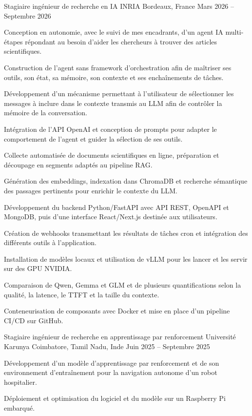 
\begin{cventries}
  \cventry
    {Stagiaire ingénieur de recherche en IA}
    {INRIA}
    {Bordeaux, France}
    {Mars 2026 -- Septembre 2026}
    {
      \begin{cvitems}
        \item {Conception en autonomie, avec le suivi de mes encadrants, d’un agent IA multi-étapes répondant au besoin d’aider les chercheurs à trouver des articles scientifiques.}
        \item {Construction de l’agent sans framework d’orchestration afin de maîtriser ses outils, son état, sa mémoire, son contexte et ses enchaînements de tâches.}
        \item {Développement d’un mécanisme permettant à l’utilisateur de sélectionner les messages à inclure dans le contexte transmis au LLM afin de contrôler la mémoire de la conversation.}
        \item {Intégration de l’API OpenAI et conception de prompts pour adapter le comportement de l’agent et guider la sélection de ses outils.}
        \item {Collecte automatisée de documents scientifiques en ligne, préparation et découpage en segments adaptés au pipeline RAG.}
        \item {Génération des embeddings, indexation dans ChromaDB et recherche sémantique des passages pertinents pour enrichir le contexte du LLM.}
        \item {Développement du backend Python/FastAPI avec API REST, OpenAPI et MongoDB, puis d’une interface React/Next.js destinée aux utilisateurs.}
        \item {Création de webhooks transmettant les résultats de tâches cron et intégration des différents outils à l’application.}
        \item {Installation de modèles locaux et utilisation de vLLM pour les lancer et les servir sur des GPU NVIDIA.}
        \item {Comparaison de Qwen, Gemma et GLM et de plusieurs quantifications selon la qualité, la latence, le TTFT et la taille du contexte.}
        \item {Conteneurisation de composants avec Docker et mise en place d’un pipeline CI/CD sur GitHub.}
      \end{cvitems}
    }

  \cventry
    {Stagiaire ingénieur de recherche en apprentissage par renforcement}
    {Université Karunya}
    {Coimbatore, Tamil Nadu, Inde}
    {Juin 2025 -- Septembre 2025}
    {
      \begin{cvitems}
        \item {Développement d’un modèle d’apprentissage par renforcement et de son environnement d’entraînement pour la navigation autonome d’un robot hospitalier.}
        \item {Déploiement et optimisation du logiciel et du modèle sur un Raspberry Pi embarqué.}
      \end{cvitems}
    }
\end{cventries}
